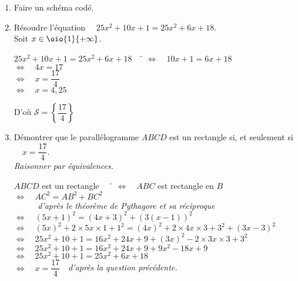 \documentclass[a4paper,11pt,exos]{nsi}
\begin{document}
\begin{enumerate}
	\item 	\textcolor{UGLiBlue}{Faire un schéma codé.}
	\begin{center}
    \end{center}
	\item   \textcolor{UGLiBlue}{Résoudre l'équation $\quad 25x^2+10x+1=25x^2+6x+18$.}\\[.5em]
	Soit $x\in\oio{1}{+\infty}$.
    \begin{tabbing}
        $25x^2+10x+1=25x^2+6x+18\quad$  \=  $\iff\quad 10x+1=6x+18$\\
        \>  $\iff\quad 4x=17$\\
        \>  $\iff\quad x=\dfrac{17}{4}$\\
        \>  $\iff\quad x=4,25$
    \end{tabbing}
    D'où $\mathcal{S}=\left\{\dfrac{17}{4}\right\}$
	\item 	\textcolor{UGLiBlue}{Démontrer que le parallélogramme $ABCD$ est un rectangle si, et seulement si $\quad x=\dfrac{17}{4}$.\\
	\textit{Raisonner par équivalences.}}
    \begin{tabbing}
        $ABCD$ est un rectangle $\quad$ \= $\iff\quad ABC$ est rectangle en $B$\\
        \>  $\iff\quad AC^2=AB^2+BC^2$\\
        \>  $\phantom{\iff} \quad$ \textit{d'après le théorème de Pythagore et sa réciproque}\\
        \> $\iff\quad (5x+1)^2=(4x+3)^2+\left(3(x-1)\right)^2$\\
        \> $\iff\quad (5x)^2+2\times 5x\times 1+1^2=(4x)^2+2\times 4x\times 3+3^2+(3x-3)^2$\\
        \> $\iff\quad 25x^2+10+1=16x^2+24x+9+(3x)^2-2\times 3x\times 3+3^2$\\
        \> $\iff\quad 25x^2+10+1=16x^2+24x+9+9x^2-18x+9$\\
        \> $\iff\quad 25x^2+10+1=25x^2+6x+18$\\[0.5em]
        \> $\iff\quad x=\dfrac{17}{4}\quad$\textit{d'après la question précédente.}
    \end{tabbing}	
  

\end{enumerate}
\end{document}

